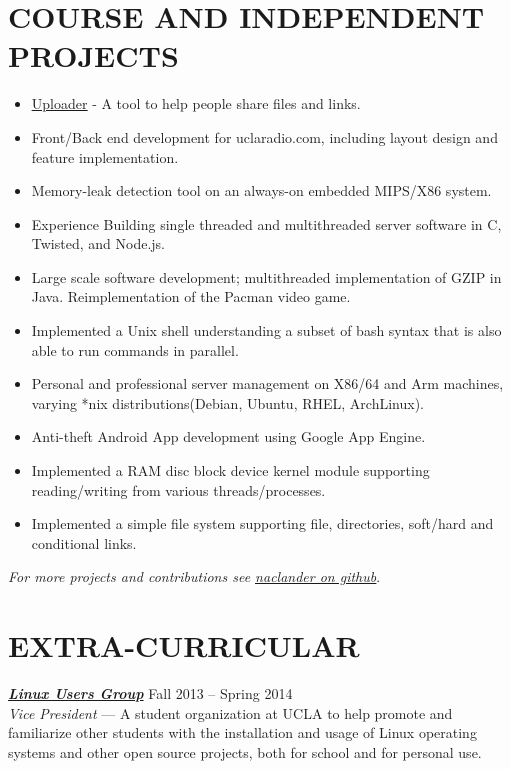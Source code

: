 \documentclass[line,letterpaper]{resume}
\begin{document}
\begin{resume}
    \section{\uppercase{Course and Independent Projects}}
	\begin{itemize}
	\item \underline{\href{https://github.com/naclander/uploader}{Uploader}} -
	A tool to help people share files and links.
	\item Front/Back end development for uclaradio.com, including layout design
	      and feature implementation.
	\item Memory-leak detection tool on an always-on embedded MIPS/X86 system.
	\item Experience Building single threaded and multithreaded server software
	      in C, Twisted, and Node.js.
	\item Large scale software development; multithreaded implementation of GZIP
	      in Java. Reimplementation of the Pacman video game.
	\item Implemented a Unix shell understanding a subset of bash syntax
	that is also able to run commands in parallel.
	\item Personal and professional server management on X86/64 and Arm machines,
	varying *nix distributions(Debian, Ubuntu, RHEL, ArchLinux).
	\item Anti-theft Android App development using Google App Engine.
	\item Implemented a RAM disc block device kernel module supporting
	reading/writing from various threads/processes.
	\item Implemented a simple file system supporting file, directories,
	soft/hard and conditional links.
	\end{itemize}
    \vspace{-6pt}

    \hfill \emph{For more projects and contributions see
    \underline{\href{https://github.com/naclander}{naclander on github}}}.

    \vspace{-15pt}

\section{\uppercase{Extra-Curricular}}
    {\sl\textbf{\href{http://linux.ucla.edu}{Linux Users Group}}} \hfill Fall 2013 -- Spring 2014\\
    \emph{Vice President} --- A student organization at UCLA to help promote
	and familiarize other students with the installation and usage of Linux
	operating systems and other open source projects, both for school and for personal use.


   \end{resume}
\end{document}
